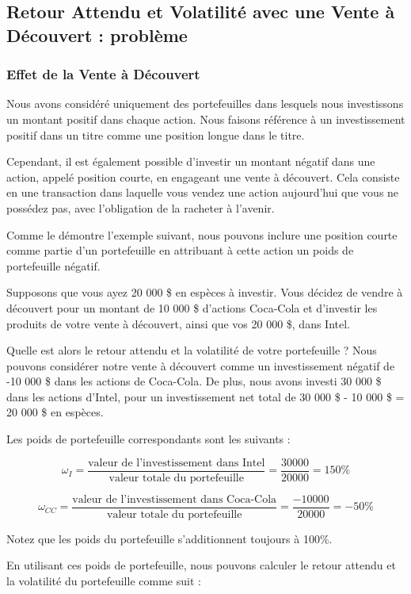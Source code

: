 \documentclass[a4paper, 12pt]{report}
\begin{document}
\subsection{Retour Attendu et Volatilité avec une Vente à Découvert : problème}

\subsubsection{Effet de la Vente à Découvert}

Nous avons considéré uniquement des portefeuilles dans lesquels nous investissons un montant positif dans chaque action. Nous faisons référence à un investissement positif dans un titre comme une position longue dans le titre.

Cependant, il est également possible d'investir un montant négatif dans une action, appelé position courte, en engageant une vente à découvert. Cela consiste en une transaction dans laquelle vous vendez une action aujourd'hui que vous ne possédez pas, avec l'obligation de la racheter à l'avenir.

Comme le démontre l'exemple suivant, nous pouvons inclure une position courte comme partie d'un portefeuille en attribuant à cette action un poids de portefeuille négatif.

Supposons que vous ayez 20 000 \$ en espèces à investir. Vous décidez de vendre à découvert pour un montant de 10 000 \$ d'actions Coca-Cola et d'investir les produits de votre vente à découvert, ainsi que vos 20 000 \$, dans Intel.

Quelle est alors le retour attendu et la volatilité de votre portefeuille ?
Nous pouvons considérer notre vente à découvert comme un investissement négatif de -10 000 \$ dans les actions de Coca-Cola. De plus, nous avons investi 30 000 \$ dans les actions d'Intel, pour un investissement net total de 30 000 \$ - 10 000 \$ = 20 000 \$ en espèces.

Les poids de portefeuille correspondants sont les suivants :

\[
\omega_I = \frac{\text{valeur de l'investissement dans Intel}}{\text{valeur totale du portefeuille}} = \frac{30 000}{20 000} = 150\%
\]

\[
\omega_{CC} = \frac{\text{valeur de l'investissement dans Coca-Cola}}{\text{valeur totale du portefeuille}} = \frac{-10 000}{20 000} = -50\%
\]

Notez que les poids du portefeuille s'additionnent toujours à 100\%.

En utilisant ces poids de portefeuille, nous pouvons calculer le retour attendu et la volatilité du portefeuille comme suit :
\end{document}
